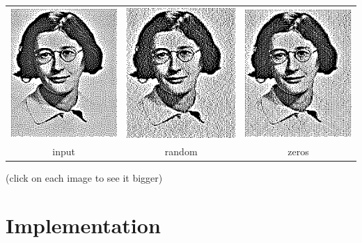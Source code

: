 \begin{tabular}{ccc}
	\href{z-psimone-retdit.png}{\includegraphics{psimone-retdit.png}}&
	\href{z-psimone-retditR.png}{\includegraphics{psimone-retditR.png}}&
	\href{z-psimone-retditZ.png}{\includegraphics{psimone-retditZ.png}}\\
	input & random & zeros
\end{tabular}
(click on each image to see it bigger)

\section{Implementation}

